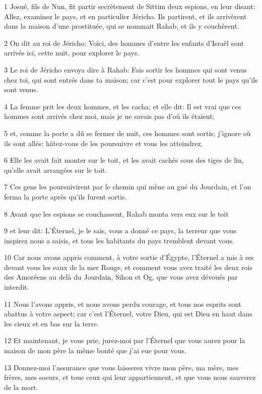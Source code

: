 \par 1 Josué, fils de Nun, fit partir secrètement de Sittim deux espions, en leur disant: Allez, examinez le pays, et en particulier Jéricho. Ils partirent, et ils arrivèrent dans la maison d'une prostituée, qui se nommait Rahab, et ils y couchèrent.
\par 2 On dit au roi de Jéricho: Voici, des hommes d'entre les enfants d'Israël sont arrivés ici, cette nuit, pour explorer le pays.
\par 3 Le roi de Jéricho envoya dire à Rahab: Fais sortir les hommes qui sont venus chez toi, qui sont entrés dans ta maison; car c'est pour explorer tout le pays qu'ils sont venus.
\par 4 La femme prit les deux hommes, et les cacha; et elle dit: Il est vrai que ces hommes sont arrivés chez moi, mais je ne savais pas d'où ils étaient;
\par 5 et, comme la porte a dû se fermer de nuit, ces hommes sont sortis; j'ignore où ils sont allés: hâtez-vous de les poursuivre et vous les atteindrez.
\par 6 Elle les avait fait monter sur le toit, et les avait cachés sous des tiges de lin, qu'elle avait arrangées sur le toit.
\par 7 Ces gens les poursuivirent par le chemin qui mène au gué du Jourdain, et l'on ferma la porte après qu'ils furent sortis.
\par 8 Avant que les espions se couchassent, Rahab monta vers eux sur le toit
\par 9 et leur dit: L'Éternel, je le sais, vous a donné ce pays, la terreur que vous inspirez nous a saisis, et tous les habitants du pays tremblent devant vous.
\par 10 Car nous avons appris comment, à votre sortie d'Égypte, l'Éternel a mis à sec devant vous les eaux de la mer Rouge, et comment vous avez traité les deux rois des Amoréens au delà du Jourdain, Sihon et Og, que vous avez dévoués par interdit.
\par 11 Nous l'avons appris, et nous avons perdu courage, et tous nos esprits sont abattus à votre aspect; car c'est l'Éternel, votre Dieu, qui est Dieu en haut dans les cieux et en bas sur la terre.
\par 12 Et maintenant, je vous prie, jurez-moi par l'Éternel que vous aurez pour la maison de mon père la même bonté que j'ai eue pour vous.
\par 13 Donnez-moi l'assurance que vous laisserez vivre mon père, ma mère, mes frères, mes soeurs, et tous ceux qui leur appartiennent, et que vous nous sauverez de la mort.

